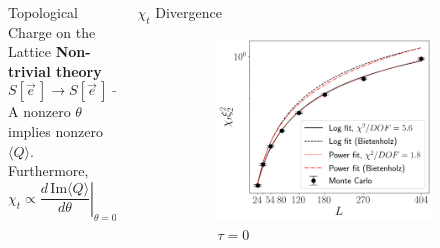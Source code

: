 \documentclass[18pt]{beamer}
\renewenvironment{equation}
    {
    \begin{equation*}
    }
    { 
    \end{equation*}
    }
\newcommand{\e}{\vec e}
\begin{document}
\begin{frame}{}
\begin{columns}[t]
\begin{column}{0.32\linewidth}
\begin{block}{Topological Charge on the Lattice}
        \vspace{2em}
        {\bf Non-trivial theory}
        \begin{equation*}
            S[\e\,] \rightarrow S[\e\,] - i \theta Q[\e\,].
        \end{equation*}
        A nonzero $\theta$ implies nonzero $\langle Q \rangle$. Furthermore,
        \begin{equation}
            \chi_t \propto \left. \frac{d\,\mathrm{Im}\langle Q \rangle}{d\theta}\right|_{\theta=0}
        \end{equation}
        \end{block}
        \printbibliography
    \end{column}%
    \begin{column}{0.32\linewidth}

    \begin{block}{$\chi_t$ Divergence}
        \begin{figure}[h!]
            \begin{center}
              \begin{subfigure}[b]{0.45\textwidth}
                  \includegraphics[height=0.7\textwidth]{divergence.png}
                  \caption{$\tau = 0$}
              \end{subfigure}%
              \begin{subfigure}[b]{0.45\textwidth}
                  \centering

\end{subfigure}
\end{center}
\end{figure}
\end{block}
\end{column}
\end{columns}
\end{frame}
\end{document}
